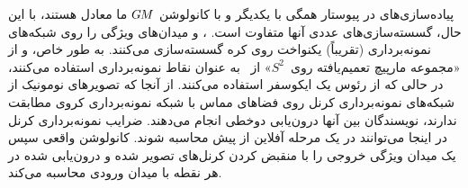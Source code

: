 پیاده‌سازی‌های \cite{coors2018spherenet,zhao2018distortion,tateno2018distortion,eder2019convolutions,martin2020panoramic}
در پیوستار همگی با یکدیگر و با کانولوشن $G\mkern-1.4muM$ ما معادل هستند، با این حال، گسسته‌سازی‌های عددی آنها متفاوت است.
\citet{coors2018spherenet}، \citet{eder2019convolutions} و \citet{martin2020panoramic} میدان‌های ویژگی را روی شبکه‌های نمونه‌برداری (تقریباً) یکنواخت روی کره گسسته‌سازی می‌کنند.
به طور خاص، \citet{coors2018spherenet} و \citet{martin2020panoramic} از «مجموعه مارپیچ تعمیم‌یافته روی~$S^2$» از~\cite{saff1997distributing} به عنوان نقاط نمونه‌برداری استفاده می‌کنند، در حالی که \citet{eder2019convolutions} از رئوس یک ایکوسفر استفاده می‌کنند.
از آنجا که تصویرهای نومونیک از شبکه‌های نمونه‌برداری کرنل روی فضاهای مماس با شبکه نمونه‌برداری کروی مطابقت ندارند، نویسندگان بین آنها درون‌یابی دوخطی انجام می‌دهند.
ضرایب نمونه‌برداری کرنل در اینجا می‌توانند در یک مرحله آفلاین از پیش محاسبه شوند.
کانولوشن واقعی سپس یک میدان ویژگی خروجی را با منقبض کردن کرنل‌های تصویر شده و درون‌یابی شده در هر نقطه با میدان ورودی محاسبه می‌کند.


